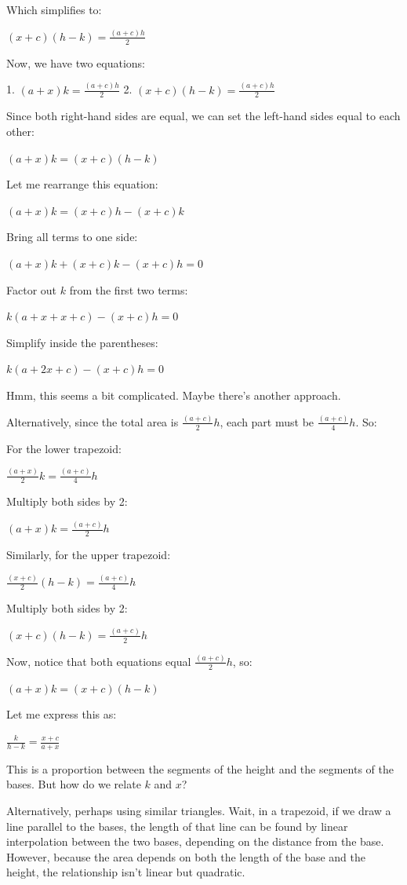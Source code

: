 \begin{tcolorbox}[
  title=Multiagent Collaborative Reasoning Trace Data Sample,
  breakable,
  colback=white,
  colframe=black
]
Which simplifies to:

\( (x + c)(h - k) = \frac{(a + c)h}{2} \)

Now, we have two equations:

1. \( (a + x)k = \frac{(a + c)h}{2} \)
2. \( (x + c)(h - k) = \frac{(a + c)h}{2} \)

Since both right-hand sides are equal, we can set the left-hand sides equal to each other:

\( (a + x)k = (x + c)(h - k) \)

Let me rearrange this equation:

\( (a + x)k = (x + c)h - (x + c)k \)

Bring all terms to one side:

\( (a + x)k + (x + c)k - (x + c)h = 0 \)

Factor out \( k \) from the first two terms:

\( k(a + x + x + c) - (x + c)h = 0 \)

Simplify inside the parentheses:

\( k(a + 2x + c) - (x + c)h = 0 \)

Hmm, this seems a bit complicated. Maybe there's another approach.

Alternatively, since the total area is \( \frac{(a + c)}{2}h \), each part must be \( \frac{(a + c)}{4}h \). So:

For the lower trapezoid:

\( \frac{(a + x)}{2}k = \frac{(a + c)}{4}h \)

Multiply both sides by 2:

\( (a + x)k = \frac{(a + c)}{2}h \)

Similarly, for the upper trapezoid:

\( \frac{(x + c)}{2}(h - k) = \frac{(a + c)}{4}h \)

Multiply both sides by 2:

\( (x + c)(h - k) = \frac{(a + c)}{2}h \)

Now, notice that both equations equal \( \frac{(a + c)}{2}h \), so:

\( (a + x)k = (x + c)(h - k) \)

Let me express this as:

\( \frac{k}{h - k} = \frac{x + c}{a + x} \)

This is a proportion between the segments of the height and the segments of the bases. But how do we relate \( k \) and \( x \)?

Alternatively, perhaps using similar triangles. Wait, in a trapezoid, if we draw a line parallel to the bases, the length of that line can be found by linear interpolation between the two bases, depending on the distance from the base. However, because the area depends on both the length of the base and the height, the relationship isn't linear but quadratic.


\end{tcolorbox}
